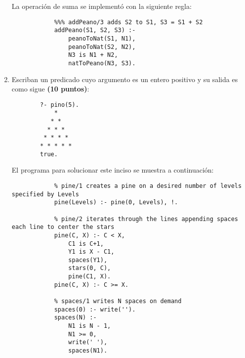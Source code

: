 \begin{enumerate}
\begin{solution}
        La operación de suma se implementó con la siguiente regla:
        \begin{verbatim}
            %%% addPeano/3 adds S2 to S1, S3 = S1 + S2
            addPeano(S1, S2, S3) :-
                peanoToNat(S1, N1),
                peanoToNat(S2, N2),
                N3 is N1 + N2,
                natToPeano(N3, S3).
        \end{verbatim}
    \end{solution}
    \item Escriban un predicado  cuyo argumento es un entero positivo y su salida es como sigue \textbf{(10 puntos)}:
    \begin{verbatim}
        ?- pino(5).
            *
           * *
          * * *
         * * * *
        * * * * *
        true.
    \end{verbatim}
    \begin{solution}
        El programa para solucionar este inciso se muestra a continuación:
        \begin{verbatim}
            % pine/1 creates a pine on a desired number of levels specified by Levels
            pine(Levels) :- pine(0, Levels), !.

            % pine/2 iterates through the lines appending spaces each line to center the stars
            pine(C, X) :- C < X, 
                C1 is C+1,
                Y1 is X - C1,
                spaces(Y1),
                stars(0, C),
                pine(C1, X).
            pine(C, X) :- C >= X.

            % spaces/1 writes N spaces on demand
            spaces(0) :- write('').
            spaces(N) :-
                N1 is N - 1,
                N1 >= 0,
                write(' '),
                spaces(N1).


\end{verbatim}
\end{solution}
\end{enumerate}
